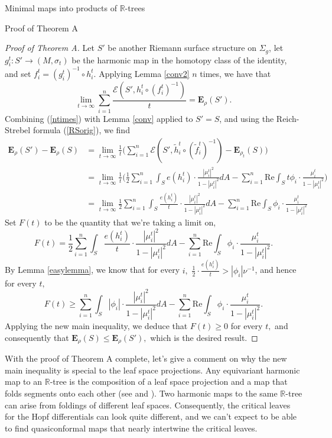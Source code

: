 \documentclass[10pt]{amsart}
\newcommand{\R}{\mathbb R}
\theoremstyle{definition}
\begin{document}
\begin{section}{Minimal maps into products of $\R$-trees}
\begin{subsection}{Proof of Theorem A}
\begin{proof}[Proof of Theorem A]
Let $S'$ be another Riemann surface structure on $\Sigma_g$, let $g_i^t:S'\to (M,\sigma_t)$ be the harmonic map in the homotopy class of the identity, and set $f_i^t=(g_i^t)^{-1}\circ h_i^t.$ Applying Lemma \ref{conv2} $n$ times, we have that 
\begin{equation}\label{ntimes}
    \lim_{t\to\infty}\sum_{i=1}^n\frac{\mathcal{E}(S',h_i^t\circ (f_i^t)^{-1})}{t}=\mathbf{E}_\rho(S').
\end{equation}
Combining (\ref{ntimes}) with Lemma \ref{conv} applied to $S'=S$, and using the Reich-Strebel formula (\ref{RSorig}), we find
\begin{align*}
    \mathbf{E}_\rho(S')-\mathbf{E}_\rho(S)&=\lim_{t\to\infty}\frac{1}{t}\Big (\sum_{i=1}^n\mathcal{E}(S',\tilde{h}_i^t\circ (\tilde{f}_i^t)^{-1})- \mathbf{E}_{\rho_t}(S)\Big ) \\
    &=\lim_{t\to\infty} \frac{1}{t}\Big (\frac{1}{2}\sum_{i=1}^n \int_S e(h_i^t)\cdot \frac{|\mu_i^t|^2}{1-|\mu_i^t|^2}dA- \sum_{i=1}^n \textrm{Re} \int_S t\phi_i\cdot \frac{ \mu_i^t}{1-|\mu_i^t|^2}\Big ) \\
    &= \lim_{t\to\infty}\frac{1}{2}\sum_{i=1}^n \int_S \frac{e(h_i^t)}{t}\cdot \frac{|\mu_i^t|^2}{1-|\mu_i^t|^2}dA- \sum_{i=1}^n \textrm{Re} \int_S \phi_i\cdot \frac{ \mu_i^t}{1-|\mu_i^t|^2}
\end{align*}
Set $F(t)$ to be the quantity that we're taking a limit on, $$F(t)=\frac{1}{2}\sum_{i=1}^n \int_S \frac{e(h_i^t)}{t}\cdot \frac{|\mu_i^t|^2}{1-|\mu_i^t|^2}dA- \sum_{i=1}^n \textrm{Re} \int_S \phi_i\cdot \frac{ \mu_i^t}{1-|\mu_i^t|^2}.$$
By Lemma \ref{easylemma}, we know that for every $i,$ $\frac{1}{2}\cdot\frac{e(h_i^t)}{t}>|\phi_i|\nu^{-1}$, and hence for every $t,$
$$F(t)\geq \sum_{i=1}^n \int_S |\phi_i|\cdot \frac{|\mu_i^t|^2}{1-|\mu_i^t|^2}dA- \sum_{i=1}^n \textrm{Re} \int_S \phi_i\cdot \frac{ \mu_i^t}{1-|\mu_i^t|^2}.$$ Applying the new main inequality, we deduce that $F(t)\geq 0$ for every $t,$ and consequently that $\mathbf{E}_\rho(S)\leq \mathbf{E}_\rho(S'),$ which is the desired result.
 \end{proof}

With the proof of Theorem A complete, let's give a comment on why the new main inequality is special to the leaf space projections. Any equivariant harmonic map to an $\R$-tree is the composition of a leaf space projection and a map that folds segments onto each other (see \cite{FW} and \cite[Section 4.1]{MSS}). Two harmonic maps to the same $\R$-tree can arise from foldings of different leaf spaces. Consequently, the critical leaves for the Hopf differentials can look quite different, and we can't expect to be able to find quasiconformal maps that nearly intertwine the critical leaves.


\end{subsection}
\end{section}
\end{document}
